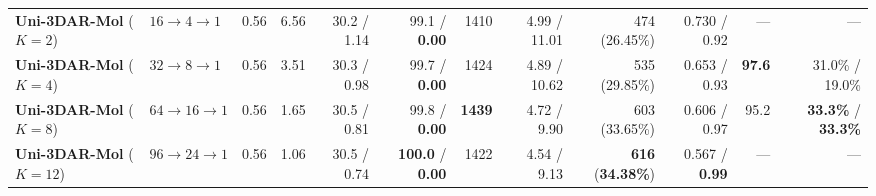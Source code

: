 \documentclass[11pt,a4paper]{article}
\begin{document}
\begin{table}[!t]
{\begin{tabular}{@{}llrrrrrrrrrr@{}}
    \textbf{Uni-3DAR-Mol} ($K=2$) & $16\to 4\to 1$ & 0.56 & 6.56 & 30.2 / 1.14 & 99.1 / \textbf{0.00} & 1410 & 4.99 / 11.01 & 474 (26.45\%) & 0.730 / 0.92 & --- & --- \\
    \textbf{Uni-3DAR-Mol} ($K=4$) & $32\to 8\to 1$ & 0.56 & 3.51 & 30.3 / 0.98 & 99.7 / \textbf{0.00} & 1424 & 4.89 / 10.62 & 535 (29.85\%) & 0.653 / 0.93 & \textbf{97.6} & 31.0\% / 19.0\% \\
    \textbf{Uni-3DAR-Mol} ($K=8$) & $64\to 16\to 1$ & 0.56 & 1.65 & 30.5 / 0.81 & 99.8 / \textbf{0.00} & \textbf{1439} & 4.72 / 9.90 & 603 (33.65\%) & 0.606 / 0.97 & 95.2 & \textbf{33.3\%} / \textbf{33.3\%} \\
    \textbf{Uni-3DAR-Mol} ($K=12$) & $96\to 24\to 1$ & 0.56 & 1.06 & 30.5 / 0.74 & \textbf{100.0} / \textbf{0.00} & 1422 & 4.54 / 9.13 & \textbf{616} (\textbf{34.38\%}) & 0.567 / \textbf{0.99} & --- & --- \\
    \bottomrule
  \end{tabular}%
  }


\end{table}
\end{document}
